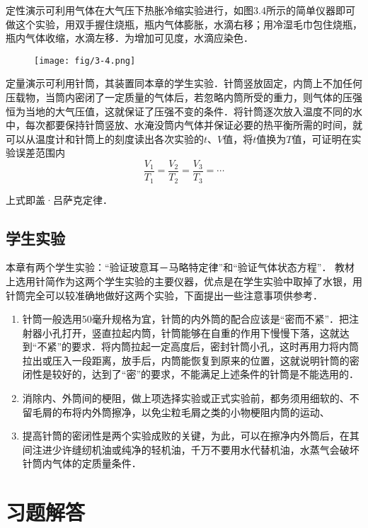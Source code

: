 定性演示可利用气体在大气压下热胀冷缩实验进行，如图3.4所示的简单仪器即可做这个实验，用双手握住烧瓶，瓶内气体膨胀，水滴右移；用冷湿毛巾包住烧瓶，瓶内气体收缩，水滴左移．为增加可见度，水滴应染色．
\begin{figure}[htp]
    \centering
\texttt{[image: fig/3-4.png]}
    \caption{}
\end{figure}

定量演示可利用针筒，其装置同本章的学生实验．针筒竖放固定，内筒上不加任何压载物，当筒内密闭了一定质量的气体后，若忽略内筒所受的重力，则气体的压强恒为当地的大气压值，这就保证了压强不变的条件．将针筒逐次放入温度不同的水中，每次都要保持针筒竖放、水淹没筒内气体并保证必要的热平衡所需的时间，就可以从温度计和针筒上的刻度读出各次实验的$t$、$V$值，将$t$值换为$T$值，可证明在实验误差范围内
\[\frac{V_1}{T_1}=\frac{V_2}{T_2}=\frac{V_3}{T_3}=\cdots\]

上式即盖·吕萨克定律．

\subsection{学生实验}
本章有两个学生实验：“验证玻意耳－马略特定律”和“验证气体状态方程”． 教材上选用针简作为这两个学生实验的主要仪器，优点是在学生实验中取掉了水银，用针筒完全可以较准确地做好这两个实验，下面提出一些注意事项供参考．

\begin{enumerate}
    \item 针筒一般选用50毫升规格为宜，针筒的内外筒的配合应该是“密而不紧”．把注射器小孔打开，竖直拉起内筒，针筒能够在自重的作用下慢慢下落，这就达到“不紧”的要求．将内筒拉起一定高度后，密封针筒小孔，这时再用力将内筒拉出或压入一段距离，放手后，内筒能恢复到原来的位置，这就说明针筒的密闭性是较好的，达到了“密”的要求，不能满足上述条件的针筒是不能选用的．
\item 消除内、外筒间的梗阻，做上项选择实验或正式实验前，都务须用细软的、不留毛屑的布将内外筒擦净，以免尘粒毛屑之类的小物梗阻内筒的运动、
\item 提高针筒的密闭性是两个实验成败的关键，为此，可以在擦净内外筒后，在其间注进少许缝纫机油或纯净的轻机油，千万不要用水代替机油，水蒸气会破坏针筒内气体的定质量条件．
\end{enumerate}

\section{习题解答}

